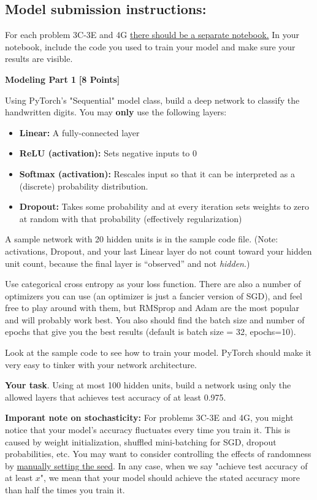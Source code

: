 \subsection{Model submission instructions: }
For each problem 3C-3E and 4G \underline{there should be a separate notebook.} In your notebook, include the code you used to train your model and make sure your results are visible.

 \problem \textbf{Modeling Part 1} \textbf{[8 Points]}

 Using PyTorch's "Sequential" model class, build a deep network to classify the handwritten digits. You may \textbf{only} use the following layers:

 \begin{itemize}
  \item \textbf{Linear:} A fully-connected layer
  \item \textbf{ReLU (activation):} Sets negative inputs to 0
  \item \textbf{Softmax (activation):} Rescales input so that it can be interpreted as a (discrete) probability distribution.
  \item \textbf{Dropout:} Takes some probability and at every iteration sets weights to zero at random with that probability (effectively regularization)
\end{itemize}

A sample network with 20 hidden units is in the sample code file. (Note: activations, Dropout, and your last Linear layer do not count toward your hidden unit count, because the final layer is ``observed'' and not \emph{hidden}.)

Use categorical cross entropy as your loss function. There are also a number of optimizers  you can use (an optimizer is just a fancier version of SGD), and feel free to play around with them, but RMSprop and Adam are the most popular and will probably work best. You also should find the batch size and number of epochs that give you the best results (default is batch size = 32, epochs=10).

Look at the sample code to see how to train your model. PyTorch should make it very easy to tinker with your network architecture.

\textbf{Your task}. Using at most 100 hidden units, build a network using only the allowed layers that achieves test accuracy of at least 0.975.

\textbf{Imporant note on stochasticity: } For problems 3C-3E and 4G, you might notice that your model's accuracy fluctuates every time you train it. This is caused by weight initialization, shuffled mini-batching for SGD, dropout probabilities, etc. You may want to consider controlling the effects of randomness by \href{https://pytorch.org/docs/stable/generated/torch.manual_seed.html}{manually setting the seed}. In any case, when we say "achieve test accuracy of at least $x$", we mean that your model should achieve the stated accuracy more than half the times you train it.

